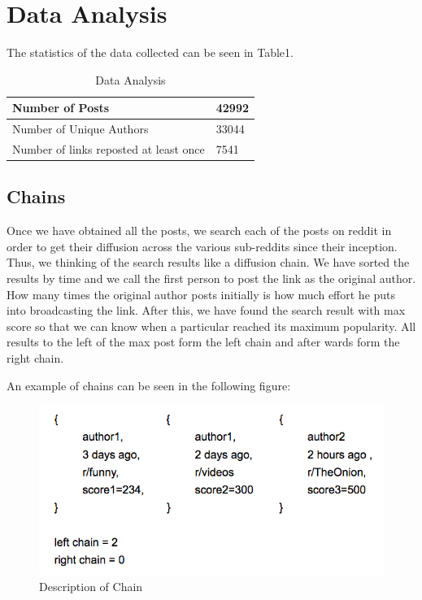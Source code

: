 \documentclass{article} %
\begin{document}
\section{Data Analysis}

The statistics of the data collected can be seen in Table1.

\begin{table}
\begin{center}
    \begin{tabular}{ | l | l | }
    \hline
    Number of Posts & 42992 \\ \hline
    Number of Unique Authors & 33044 \\ \hline
    Number of links reposted at least once & 7541 \\ \hline
    \end{tabular}
    \caption{Data Analysis}
\end{center}
\end{table}

\subsection{Chains}

Once we have obtained all the posts, we search each of the posts on reddit in order to get their diffusion across the various sub-reddits since their inception. Thus, we thinking of the search results like a diffusion chain. We have sorted the results by time and we call the first person to post the link as the original author. How many times the original author posts initially is how much effort he puts into broadcasting the link. After this, we have found the search result with max score so that we can know when a particular reached its maximum popularity. All results to the left of the max post form the left chain and after wards form the right chain.

An example of chains can be seen in the following figure:

\begin{figure}[h]
\begin{center}
\includegraphics[width=5in]{chain.png}
\caption{Description of Chain}
\end{center}
\end{figure}
\end{document}
